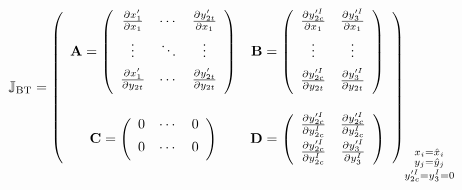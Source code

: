 \documentclass{article}
\begin{document}
\begin{equation}
	\mathbb{J}_{\text{BT}} = \left( \begin{array}{cc}
		\mathbf{A} = \left( \begin{array}{ccc} 
										\frac{\partial x'_1}{\partial x_1} & \cdots & \frac{\partial y'_{2t}}{\partial x_1} \\[1ex]
										\vdots & \ddots & \vdots \\[1ex]
										\frac{\partial x'_1}{\partial y_{2t}} & \cdots & \frac{\partial y'_{2t}}{\partial y_{2t}} \\[1ex]
									\end{array} \right) &
				\mathbf{B} = \left( \begin{array}{cc} 
										\frac{\partial y'^I_{2c}}{\partial x_1} & \frac{\partial y'^I_{3}}{\partial x_1} \\[1ex]
										\vdots & \vdots \\[1ex]
										\frac{\partial y'^I_{2c}}{\partial y_{2t}} & \frac{\partial y'^I_{3}}{\partial y_{2t}} \\[1ex]
									\end{array} \right) \\
		\!\rule{0pt}{0pt} \\
		\mathbf{C} = \left( \begin{array}{ccc} 
								0 & \cdots & 0\\[1ex]
								0 & \cdots & 0\\[1ex]
							\end{array} \right) &
		\mathbf{D} = \left( \begin{array}{cc} 
								\frac{\partial y'^I_{2c}}{\partial y^I_{2c}} & \frac{\partial y'^I_{2c}}{\partial y^I_{2c}} \\[1ex]
								\frac{\partial y'^I_{2c}}{\partial y^I_{2c}} & \frac{\partial y'^I_{3}}{\partial y^I_{3}} \\[1ex]
							\end{array} \right) \\[1ex]
				 \end{array} \right)_{\substack{
										x_i = \hat{x}_i \\
										y_j = \hat{y}_j \\
										y'^I_{2c} = y^I_{3} = 0}} \\[1ex]
\end{equation}
\end{document}

